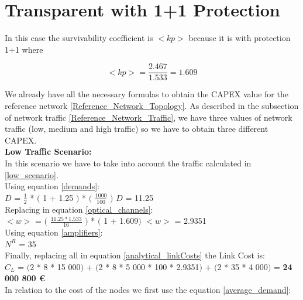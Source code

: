 \clearpage

\section{Transparent with 1+1 Protection}\label{analytical_Transp_Protection}

In this case the survivability coefficient is $<kp>$ because it is with protection 1+1 where

\begin{equation*}
<kp> = \frac{2.467}{1.533} = 1.609
\end{equation*}

We already have all the necessary formulas to obtain the CAPEX value for the reference network \ref{Reference_Network_Topology}. As described in the subsection of network traffic \ref{Reference_Network_Traffic}, we have three values of network traffic (low, medium and high traffic) so we have to obtain three different CAPEX.\\

\textbf{Low Traffic Scenario:}\\

In this scenario we have to take into account the traffic calculated in \ref{low_scenario}.\\

Using equation \ref{demands}:\\

$D$ = $\frac{1}{2}$ * $($ 1 + 1.25 $)$ * $($ $\frac{1000}{100}$ $)$ \qquad \qquad $D$ = 11.25\\

Replacing in equation \ref{optical_channels}:\\

$<w>$ = $($ $\frac{11.25 * 1.533}{16}$ $)$ * $($ 1 + 1.609$)$ \qquad \qquad $<w>$ = 2.9351\\

Using equation \ref{amplifiers}:\\

$N^R$ = 35\\

Finally, replacing all in equation \ref{analytical_linkCosts} the Link Cost is:\\

$C_L$ = $($2 * 8 * 15 000$)$ + $($2 * 8 * 5 000 * 100 * 2.9351$)$ + $($2 * 35 * 4 000$)$ = \textbf{24 000 800 \euro}\\

In relation to the cost of the nodes we first use the equation \ref{average_demand}:\\

